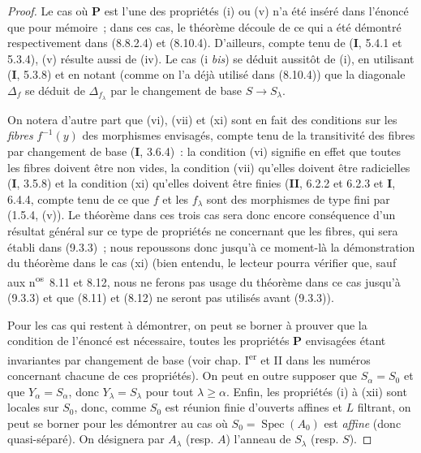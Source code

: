 \begin{proof}
Le cas où $\boldsymbol{P}$ est l'une des propriétés (i) ou (v) n'a été inséré dans
l'énoncé que pour mémoire~; dans ces cas, le théorème découle de ce qui a été
démontré respectivement dans (8.8.2.4) et (8.10.4). D'ailleurs, compte tenu de
(\textbf{I}, 5.4.1 et 5.3.4), (v) résulte aussi de (iv). Le cas (i \emph{bis}) se
déduit aussitôt de (i), en utilisant (\textbf{I}, 5.3.8) et en notant (comme on l'a
déjà utilisé dans (8.10.4)) que la diagonale $\Delta_f$ se déduit de
$\Delta_{f_\lambda}$ par le changement de base $S\to S_\lambda$.

On notera d'autre part que (vi), (vii) et (xi) sont en fait des conditions
sur les \emph{fibres} $f^{-1}(y)$ des morphismes envisagés, compte tenu de la
transitivité des fibres par changement de base (\textbf{I}, 3.6.4)~: la condition (vi)
signifie en effet que toutes les fibres doivent être non vides, la condition
(vii) qu'elles doivent être radicielles (\textbf{I}, 3.5.8) et la condition (xi)
qu'elles doivent être finies (\textbf{II}, 6.2.2 et 6.2.3 et \textbf{I}, 6.4.4, compte tenu de
ce que $f$ et les $f_\lambda$ sont des morphismes de type fini par (1.5.4,
(v)). Le théorème dans ces trois cas sera donc encore conséquence d'un
résultat général sur ce type de propriétés ne concernant que les fibres, qui
sera établi dans (9.3.3)~; nous repoussons donc jusqu'à ce moment-là la
démonstration du théorème dans le cas (xi) (bien entendu, le lecteur pourra
vérifier que, sauf aux n\textsuperscript{os}~8.11 et 8.12, nous ne ferons pas
usage du théorème dans ce cas jusqu'à (9.3.3) et que (8.11) et (8.12) ne
seront pas utilisés avant (9.3.3)).

Pour les cas qui restent à démontrer, on peut se borner à prouver que la
condition de l'énoncé est nécessaire, toutes les propriétés $\boldsymbol{P}$
envisagées étant invariantes par changement de base (voir chap. I\textsuperscript{er}
et II dans les numéros concernant chacune de ces propriétés). On peut en
outre supposer que $S_\alpha=S_0$ et que $Y_\alpha=S_\alpha$, donc
$Y_\lambda=S_\lambda$ pour tout $\lambda\geq\alpha$. Enfin, les propriétés
(i) à (xii) sont locales sur $S_0$, donc, comme $S_0$ est réunion finie
d'ouverts affines et $L$ filtrant, on peut se borner pour les démontrer au cas
où $S_0=\operatorname{Spec}(A_0)$ est \emph{affine} (donc quasi-séparé). On désignera
par $A_\lambda$ (resp. $A$) l'anneau de $S_\lambda$ (resp. $S$).


\end{proof}
